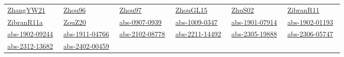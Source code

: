 \begin{longtable}{*{6}{l}}
\href{works/ZhangYW21.pdf}{ZhangYW21}~\cite{ZhangYW21} & \href{works/Zhou96.pdf}{Zhou96}~\cite{Zhou96} & \href{works/Zhou97.pdf}{Zhou97}~\cite{Zhou97} & \href{works/ZhouGL15.pdf}{ZhouGL15}~\cite{ZhouGL15} & \href{works/ZhuS02.pdf}{ZhuS02}~\cite{ZhuS02} & \href{works/ZibranR11.pdf}{ZibranR11}~\cite{ZibranR11}\\ 
\href{works/ZibranR11a.pdf}{ZibranR11a}~\cite{ZibranR11a} & \href{works/ZouZ20.pdf}{ZouZ20}~\cite{ZouZ20} & \href{works/abs-0907-0939.pdf}{abs-0907-0939}~\cite{abs-0907-0939} & \href{works/abs-1009-0347.pdf}{abs-1009-0347}~\cite{abs-1009-0347} & \href{works/abs-1901-07914.pdf}{abs-1901-07914}~\cite{abs-1901-07914} & \href{works/abs-1902-01193.pdf}{abs-1902-01193}~\cite{abs-1902-01193}\\ 
\href{works/abs-1902-09244.pdf}{abs-1902-09244}~\cite{abs-1902-09244} & \href{works/abs-1911-04766.pdf}{abs-1911-04766}~\cite{abs-1911-04766} & \href{works/abs-2102-08778.pdf}{abs-2102-08778}~\cite{abs-2102-08778} & \href{works/abs-2211-14492.pdf}{abs-2211-14492}~\cite{abs-2211-14492} & \href{works/abs-2305-19888.pdf}{abs-2305-19888}~\cite{abs-2305-19888} & \href{works/abs-2306-05747.pdf}{abs-2306-05747}~\cite{abs-2306-05747}\\ 
\href{works/abs-2312-13682.pdf}{abs-2312-13682}~\cite{abs-2312-13682} & \href{works/abs-2402-00459.pdf}{abs-2402-00459}~\cite{abs-2402-00459} & \end{longtable}
